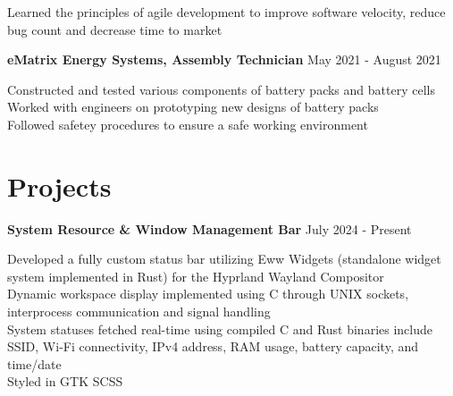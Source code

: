 \documentclass[letter,12pt]{article}
\begin{document}
\textbullet \- Learned the principles of agile development to improve software 
velocity, reduce bug count and decrease time to market\\
\begin{tcolorbox}
[colback=gray!25,
  leftrule=0pt,
  rightrule=0pt,
  sharp corners]
 \textbf{eMatrix Energy Systems, Assembly Technician}
\hfill May 2021 - August 2021 
\end{tcolorbox}
\noindent 
\textbullet \- Constructed and tested various components of
battery packs and battery cells\\ 
\textbullet \- Worked with engineers on prototyping new designs of battery packs\\
\textbullet \- Followed safetey procedures to ensure a safe working environment
\vspace{-.5cm} 

\section*{Projects} 
\vspace{-.25cm}
\begin{tcolorbox}
[colback=gray!25,
  leftrule=0pt,
  rightrule=0pt,
  sharp corners]
  \textbf{System Resource \& Window Management Bar}
\hfill July 2024 - Present
\end{tcolorbox}
\noindent
\textbullet \- Developed a fully custom status bar utilizing Eww Widgets 
(standalone widget system implemented in Rust) for the Hyprland Wayland 
Compositor\\
\textbullet \- Dynamic workspace display implemented using C through UNIX sockets, interprocess 
communication and signal handling\\
\textbullet \- System statuses fetched real-time using compiled C and Rust binaries include
SSID, Wi-Fi connectivity, IPv4 address, RAM usage, battery capacity, and time/date\\
\textbullet \- Styled in GTK SCSS \\
\textbullet \- \href{https://github.com/DMGDy/eww-bar}
{}
\end{document}
